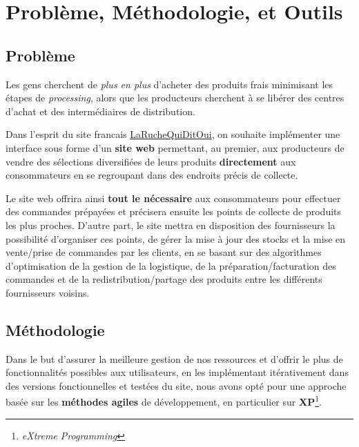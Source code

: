 \documentclass[a4paper,12pt]{report}
\theoremstyle{break}
\theoremstyle{break}
\theoremstyle{break}
\theoremstyle{break}
\theoremstyle{definition}
\theoremstyle{remark}
\begin{document}
\chapter{Problème, Méthodologie, et Outils}
\section{Problème}
Les gens cherchent de \textit{plus en plus} d'acheter des produits frais minimisant les étapes de \textit{processing}, alors que les producteurs cherchent à se libérer des centres d’achat et des intermédiaires de distribution.

Dans l’esprit du site francais \href{https://laruchequiditoui.fr/fr}{LaRucheQuiDitOui}, on souhaite implémenter une interface sous forme d'un \textbf{site web} permettant, au premier, aux producteurs de vendre des sélections diversifiées de leurs produits \textbf{directement} aux consommateurs en se regroupant dans des endroits précis de collecte.

Le site web offrira ainsi \textbf{tout le nécessaire} aux consommateurs pour effectuer des commandes prépayées et précisera ensuite les points de collecte de produits les plus proches. D'autre part, le site mettra en disposition des fournisseurs la possibilité d'organiser ces points, de gérer la mise à jour des
stocks et la mise en vente/prise de commandes par les clients, en se basant sur des algorithmes d'optimisation de la gestion de la logistique, de la préparation/facturation des commandes et de la redistribution/partage des produits entre les différents fournisseurs voisins.
\section{Méthodologie}
Dans le but d'assurer la meilleure gestion de nos ressources et d'offrir le plus de fonctionnalités possibles aux utilisateurs, en les implémentant itérativement dans des versions fonctionnelles et testées du site, nous avons opté pour une approche basée sur les \textbf{méthodes agiles} de développement, en particulier sur \textbf{XP}\footnote{\textit{eXtreme Programming}}.
\end{document}
